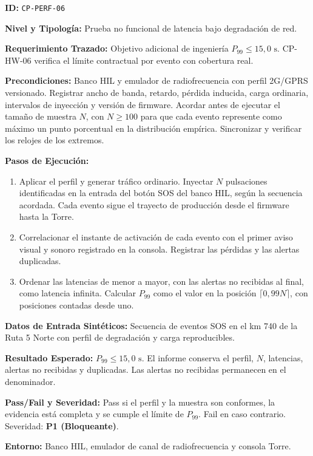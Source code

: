 \par\noindent\textbf{ID:} \texttt{CP-\allowbreak{}PERF-\allowbreak{}06}\par
\par\noindent\textbf{Nivel y Tipología:} Prueba no funcional de latencia bajo degradación de red.\par
\par\noindent\textbf{Requerimiento Trazado:} Objetivo adicional de ingeniería \(P_{99} \le 15{,}0\text{ s}\). CP-HW-06 verifica el límite contractual por evento con cobertura real.\par
\par\noindent\textbf{Precondiciones:} Banco HIL y emulador de radiofrecuencia con perfil 2G/GPRS versionado. Registrar ancho de banda, retardo, pérdida inducida, carga ordinaria, intervalos de inyección y versión de firmware. Acordar antes de ejecutar el tamaño de muestra \(N\), con \(N\ge100\) para que cada evento represente como máximo un punto porcentual en la distribución empírica. Sincronizar y verificar los relojes de los extremos.\par
\par\noindent\textbf{Pasos de Ejecución:}\par
\begin{enumerate}
\item Aplicar el perfil y generar tráfico ordinario. Inyectar \(N\) pulsaciones identificadas en la entrada del botón SOS del banco HIL, según la secuencia acordada. Cada evento sigue el trayecto de producción desde el firmware hasta la Torre.
\item Correlacionar el instante de activación de cada evento con el primer aviso visual y sonoro registrado en la consola. Registrar las pérdidas y las alertas duplicadas.
\item Ordenar las latencias de menor a mayor, con las alertas no recibidas al final, como latencia infinita. Calcular \(P_{99}\) como el valor en la posición \(\lceil 0{,}99N\rceil\), con posiciones contadas desde uno.
\end{enumerate}
\par\noindent\textbf{Datos de Entrada Sintéticos:} Secuencia de eventos SOS en el km 740 de la Ruta 5 Norte con perfil de degradación y carga reproducibles.\par
\par\noindent\textbf{Resultado Esperado:} \(P_{99}\le15{,}0\text{ s}\). El informe conserva el perfil, \(N\), latencias, alertas no recibidas y duplicadas. Las alertas no recibidas permanecen en el denominador.\par
\par\noindent\textbf{Pass/Fail y Severidad:} Pass si el perfil y la muestra son conformes, la evidencia está completa y se cumple el límite de \(P_{99}\). Fail en caso contrario. Severidad: \textbf{P1 (Bloqueante)}.\par
\par\noindent\textbf{Entorno:} Banco HIL, emulador de canal de radiofrecuencia y consola Torre.\par

